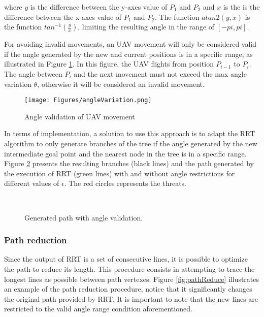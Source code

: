 where $y$ is the difference between the y-axes value of $P_1$ and $P_2$ and $x$ is the is the difference between the x-axes value of $P_1$ and $P_2$. The function $atan2(y,x)$ is the function $tan^{-1}(\frac{y}{x})$, limiting the resulting angle in the range of $[-pi, pi]$.

For avoiding invalid movements, an UAV movement will only be considered valid if the angle generated by the new and current positions is in a specific range, as illustrated in Figure \ref{fig:flightAngle}. In this figure, the UAV flights from position $P_{i-1}$ to $P_i$. The angle between $P_i$ and the next movement must not exceed the max angle variation $\theta$, otherwise it will be considered an invalid movement.

\begin{figure}[hbt!]
\centering
\texttt{[image: Figures/angleVariation.png]}
\caption{Angle validation of UAV movement}
\label{fig:flightAngle}
\end{figure}

In terms of implementation, a solution to use this approach is to adapt the RRT algorithm to only generate branches of the tree if the angle generated by the new intermediate goal point and the nearest node in the tree is in a specific range. Figure \ref{fig:pathWithAngleRestriction} presents the resulting branches (black lines) and the path generated by the execution of RRT (green lines) with and without angle restrictions for different values of $\epsilon$. The red circles represents the threats.

\begin{figure}[hbt!]
      \centering            
        \\ \centering
       \caption{Generated path with angle validation.}
      \label{fig:pathWithAngleRestriction}     
\end{figure}

\subsubsection{Path reduction}

Since the output of RRT is a set of consecutive lines, it is possible to optimize the path to reduce its length. This procedure consists in attempting to trace the longest lines as possible between path vertexes. Figure \ref{fig:pathReduce} illustrates an example of the path reduction procedure, notice that it significantly changes the original path provided by RRT. It is important to note that the new lines are restricted to the valid angle range condition aforementioned.

